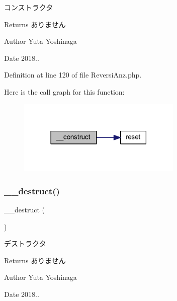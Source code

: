 コンストラクタ 

\begin{DoxyReturn}{Returns}
ありません 
\end{DoxyReturn}
\begin{DoxyAuthor}{Author}
Yuta Yoshinaga 
\end{DoxyAuthor}
\begin{DoxyDate}{Date}
2018.. 
\end{DoxyDate}


Definition at line 120 of file Reversi\+Anz.\+php.

Here is the call graph for this function\+:
\nopagebreak
\begin{figure}[H]
\begin{center}
\leavevmode
\includegraphics[width=222pt]{class_reversi_anz_a095c5d389db211932136b53f25f39685_cgraph}
\end{center}
\end{figure}
\mbox{\label{class_reversi_anz_a421831a265621325e1fdd19aace0c758}} 
\subsubsection{\texorpdfstring{\+\_\+\+\_\+destruct()}{\_\_destruct()}}
{\footnotesize\ttfamily \+\_\+\+\_\+destruct (\begin{DoxyParamCaption}{ }\end{DoxyParamCaption})}



デストラクタ 

\begin{DoxyReturn}{Returns}
ありません 
\end{DoxyReturn}
\begin{DoxyAuthor}{Author}
Yuta Yoshinaga 
\end{DoxyAuthor}
\begin{DoxyDate}{Date}
2018.. 
\end{DoxyDate}


